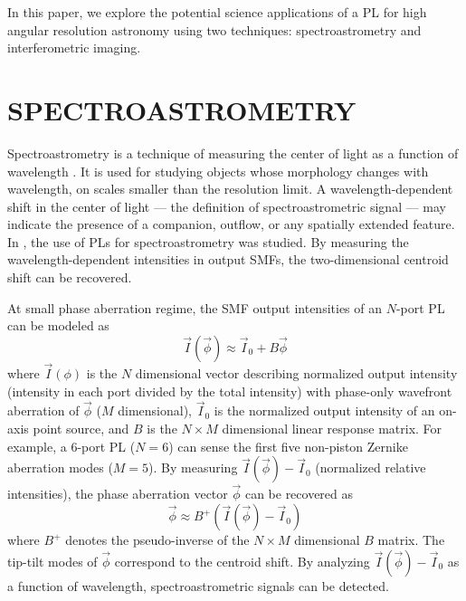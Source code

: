 \documentclass[]{AO4ELT}  %
\begin{document}
In this paper, we explore the potential science applications of a PL for high angular resolution astronomy using two techniques: spectroastrometry and interferometric imaging.



\section{SPECTROASTROMETRY}

Spectroastrometry is a technique of measuring the center of light as a function of wavelength \cite{bai98, whe04, whe08}. It is used for studying objects whose morphology changes with wavelength, on scales smaller than the resolution limit. A wavelength-dependent shift in the center of light --- the definition of spectroastrometric signal --- may indicate the presence of a companion, outflow, or any spatially extended feature. In \cite{kim22}, the use of PLs for spectroastrometry was studied. By measuring the wavelength-dependent intensities in output SMFs, the two-dimensional centroid shift can be recovered. 

At small phase aberration regime, the SMF output intensities of an $N$-port PL can be modeled as \cite{lin22a}
\begin{equation}
    \vec{I}(\vec{\phi}) \approx \vec{I}_0 + B \vec{\phi}
\end{equation}
where $\vec{I}(\phi)$ is the $N$ dimensional vector describing normalized output intensity (intensity in each port divided by the total intensity) with phase-only wavefront aberration of $\vec{\phi}$ ($M$ dimensional), $\vec{I}_0$ is the normalized output intensity of an on-axis point source, and $B$ is the $N\times M$ dimensional linear response matrix. For example, a 6-port PL ($N=6$) can sense the first five non-piston Zernike aberration modes ($M=5$). By measuring $\vec{I}(\vec{\phi}) - \vec{I}_0$ (normalized relative intensities), the phase aberration vector $\vec{\phi}$ can be recovered as
\begin{equation}\label{eq:recovery}
    \vec{\phi} \approx B^{+} (\vec{I}(\vec{\phi}) - \vec{I}_0)
\end{equation}
where $B^+$ denotes the pseudo-inverse of the $N \times M$ dimensional $B$ matrix.
The tip-tilt modes of $\vec{\phi}$ correspond to the centroid shift. By analyzing $\vec{I}(\vec{\phi}) - \vec{I}_0$ as a function of wavelength, spectroastrometric signals can be detected.
\end{document}
